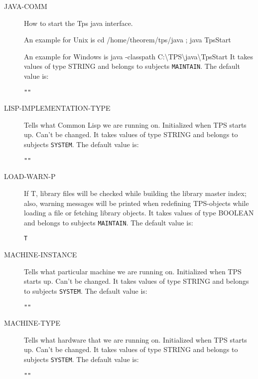 \begin{description}
\item[JAVA-COMM]  
How to start the Tps java interface.

An example for Unix is
cd /home/theorem/tps/java ; java TpsStart

An example for Windows is
java -classpath C:\textbackslash TPS\textbackslash java\textbackslash  TpsStart
It takes values of type STRING and belongs to subjects \texttt{MAINTAIN}.  The default value is: \begin{lstlisting}
""
\end{lstlisting}

\item[LISP-IMPLEMENTATION-TYPE]  
Tells what Common Lisp we are running on.  Initialized 
when TPS starts up.  Can't be changed.
It takes values of type STRING and belongs to subjects \texttt{SYSTEM}.  The default value is: \begin{lstlisting}
""
\end{lstlisting}

\item[LOAD-WARN-P]  
If T, library files will be checked while building 
the library master index; also, warning messages will be 
printed when redefining TPS-objects while loading a file 
or fetching library objects.
It takes values of type BOOLEAN and belongs to subjects \texttt{MAINTAIN}.  The default value is: \begin{lstlisting}
T
\end{lstlisting}

\item[MACHINE-INSTANCE]  
Tells what particular machine we are running on.  Initialized
when TPS starts up.  Can't be changed.
It takes values of type STRING and belongs to subjects \texttt{SYSTEM}.  The default value is: \begin{lstlisting}
""
\end{lstlisting}

\item[MACHINE-TYPE]  
Tells what hardware that we are running on.  Initialized 
when TPS starts up.  Can't be changed.
It takes values of type STRING and belongs to subjects \texttt{SYSTEM}.  The default value is: \begin{lstlisting}
""
\end{lstlisting}


\end{description}
